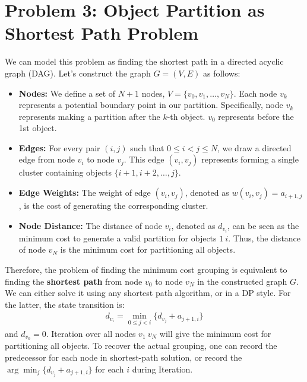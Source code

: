 \documentclass[11pt, a4paper, oneside]{memoir}
\begin{document}
\chapter{Problem 3: Object Partition as Shortest Path Problem}
We can model this problem as finding the shortest path in a directed acyclic graph (DAG).
Let's construct the graph $G = (V, E)$ as follows:
\begin{itemize}
  \item \textbf{Nodes:} We define a set of $N+1$ nodes, $V = \{v_0, v_1, \dots, v_N\}$.
        Each node $v_k$ represents a potential boundary point in our partition.
        Specifically, node $v_k$ represents making a partition after the $k$-th object.
        $v_0$ represents before the 1st object.
  \item \textbf{Edges:} For every pair $(i, j)$ such that $0 \le i < j \le N$,
        we draw a directed edge from node $v_i$ to node $v_j$.
        This edge $(v_i, v_j)$ represents forming a single cluster containing objects $\{i+1, i+2, \dots, j\}$.
  \item \textbf{Edge Weights:} The weight of edge $(v_i, v_j)$, denoted as $w(v_i, v_j)= a_{i+1, j}$,
        is the cost of generating the corresponding cluster.
  \item \textbf{Node Distance:} The distance of node $v_i$, denoted as $d_{v_i}$,
        can be seen as the minimum cost to generate a valid partition for objects $1~i$.
        Thus, the distance of node $v_N$ is the minimum cost for partitioning all objects.
\end{itemize}
Therefore, the problem of finding the minimum cost grouping is equivalent to finding the \textbf{shortest path}
from node $v_0$ to node $v_N$ in the constructed graph $G$. We can either solve it using any shortest path algorithm,
or in a DP style. For the latter, the state transition is:
\begin{align*}
  d_{v_i} = \min_{0 \le j < i} \{d_{v_j} + a_{j+1, i}\}
\end{align*}
and $d_{v_0} = 0$. Iteration over all nodes $v_1~v_N$ will give the minimum cost for partitioning all objects.
To recover the actual grouping, one can record the predecessor for each node in shortest-path solution,
or record the $\arg \min_{j} \{d_{v_j} + a_{j+1, i}\}$ for each $i$ during Iteration.
\end{document}
